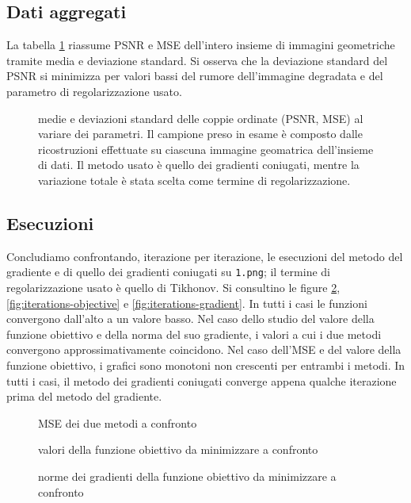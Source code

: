 \documentclass[a4paper]{article}
\begin{document}
\subsection{Dati aggregati}
La tabella \ref{fig:aggregation} riassume PSNR e MSE dell'intero insieme di
immagini geometriche tramite media e deviazione standard.
Si osserva che la deviazione standard del PSNR si minimizza per valori bassi
del rumore dell'immagine degradata e del parametro di regolarizzazione usato.
\begin{figure}\label{fig:aggregation}
    \begin{center}
        \scalebox{0.65}{}
    \end{center}
    \caption{medie e deviazioni standard delle coppie ordinate (PSNR, MSE) al
    variare dei parametri. Il campione preso in esame è composto dalle
    ricostruzioni effettuate su ciascuna immagine geomatrica dell'insieme di
    dati. Il metodo usato è quello dei gradienti coniugati, mentre la variazione totale è stata scelta come
    termine di regolarizzazione.}
\end{figure}

\subsection{Esecuzioni}
Concludiamo confrontando, iterazione per iterazione, le esecuzioni del metodo
del gradiente e di quello dei gradienti coniugati su \verb!1.png!; il termine di
regolarizzazione usato è quello di Tikhonov. Si consultino le figure
\ref{fig:iterations-error}, \ref{fig:iterations-objective} e
\ref{fig:iterations-gradient}. In tutti i casi le funzioni convergono dall'alto
a un valore basso. Nel caso dello studio del valore della funzione obiettivo e
della norma del suo gradiente, i valori a cui i due metodi convergono
approssimativamente coincidono. Nel caso dell'MSE e del valore della funzione
obiettivo, i grafici sono monotoni non crescenti per entrambi i metodi. In tutti
i casi, il metodo dei gradienti coniugati converge appena qualche iterazione
prima del metodo del gradiente.
\begin{figure}\label{fig:iterations-error}
    \begin{center}
        \scalebox{0.65}{}
    \end{center}
    \caption{MSE dei due metodi a confronto}
\end{figure}\label{fig:iterations-objective}
\begin{figure}
    \begin{center}
        \scalebox{0.65}{}
    \end{center}
    \caption{valori della funzione obiettivo da minimizzare a confronto}
\end{figure}\label{fig:iterations-gradient}
\begin{figure}
    \begin{center}
        \scalebox{0.65}{}
    \end{center}
    \caption{norme dei gradienti della funzione obiettivo da minimizzare a
    confronto}
\end{figure}
\end{document}
